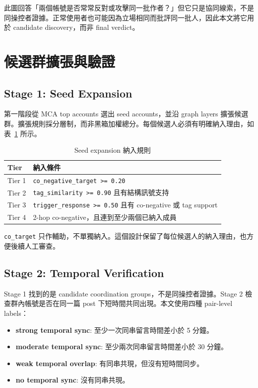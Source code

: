 \documentclass[conference]{IEEEtran}
\begin{document}
此圖回答「兩個帳號是否常常反對或攻擊同一批作者？」但它只是協同線索，不是同操控者證據。正常使用者也可能因為立場相同而批評同一批人，因此本文將它用於 candidate discovery，而非 final verdict。

\section{候選群擴張與驗證}

\subsection{Stage 1: Seed Expansion}

第一階段從 MCA top accounts 選出 seed accounts，並沿 graph layers 擴張候選群。擴張規則採分層制，而非黑箱加權總分。每個候選人必須有明確納入理由，如表~\ref{tab:tiers} 所示。

\begin{table}[htbp]
\centering
\caption{Seed expansion 納入規則}
\label{tab:tiers}
\small
\begin{tabular}{p{}p{}}
\toprule
Tier & 納入條件 \\
\midrule
Tier 1 & \texttt{co\_negative\_target >= 0.20} \\
Tier 2 & \texttt{tag\_similarity >= 0.90} 且有結構訊號支持 \\
Tier 3 & \texttt{trigger\_response >= 0.50} 且有 co-negative 或 tag support \\
Tier 4 & 2-hop co-negative，且連到至少兩個已納入成員 \\
\bottomrule
\end{tabular}
\end{table}

\texttt{co\_target} 只作輔助，不單獨納入。這個設計保留了每位候選人的納入理由，也方便後續人工審查。

\subsection{Stage 2: Temporal Verification}

Stage 1 找到的是 candidate coordination groups，不是同操控者證據。Stage 2 檢查群內帳號是否在同一篇 post 下短時間共同出現。本文使用四種 pair-level labels：

\begin{itemize}
  \item \textbf{strong temporal sync}: 至少一次同串留言時間差小於 5 分鐘。
  \item \textbf{moderate temporal sync}: 至少兩次同串留言時間差小於 30 分鐘。
  \item \textbf{weak temporal overlap}: 有同串共現，但沒有短時間同步。
  \item \textbf{no temporal sync}: 沒有同串共現。
\end{itemize}
\end{document}
